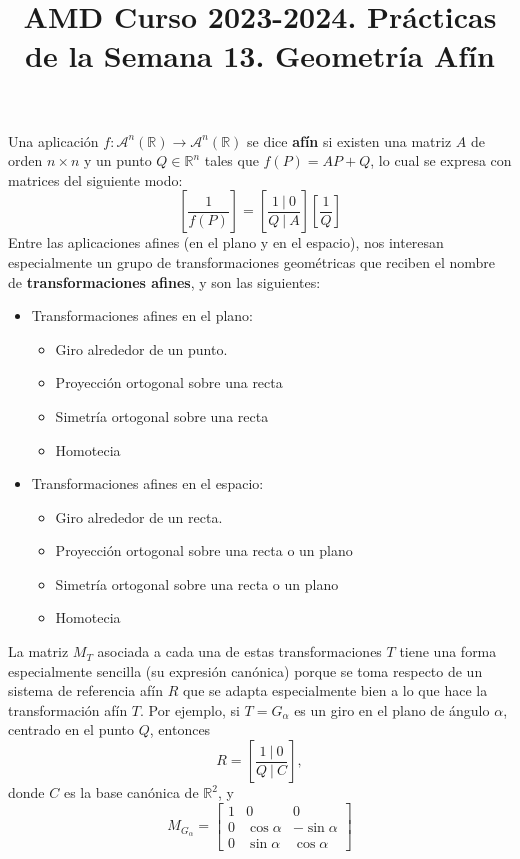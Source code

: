 \documentclass{amsart}
\title{ AMD Curso 2023-2024. Prácticas de la Semana 13. Geometría Afín}
\begin{document}
\maketitle

\begin{tcolorbox}[colback = orange!60!white,title = Cuestiones teóricas previas]
Una aplicación $f:\mathcal{A}^n(\mathbb R) \to \mathcal{A}^n(\mathbb R)$ se dice { \bf afín} si existen una matriz $A$ de orden $n\times n$ y un punto $Q\in \mathbb R^n$ tales que $f(P)=AP+Q$, lo cual se expresa con matrices del siguiente modo: 
$$\left[ \frac{1}{f(P)}\right]=\left[ \frac{ \ 1 
  \ | \  0 \ }{Q \ | \ A}\right] \left[ \frac{1}{Q}\right]$$
Entre las aplicaciones afines (en el plano y en el espacio), nos interesan especialmente un grupo de transformaciones geométricas que reciben el nombre de  {\bf transformaciones afines}, y son las siguientes:
\begin{itemize}
\item Transformaciones afines en el plano:
\begin{itemize}
\item Giro alrededor de un punto.
\item Proyección ortogonal sobre una recta
\item Simetría ortogonal sobre una recta
\item Homotecia
\end{itemize}
\item Transformaciones afines en el espacio:
\begin{itemize}
\item Giro alrededor de un recta.
\item Proyección ortogonal sobre una recta o un plano
\item Simetría ortogonal sobre una recta o un plano
\item Homotecia
\end{itemize}
\end{itemize}
La matriz $M_T$ asociada a cada una de estas transformaciones $T$ tiene una forma especialmente sencilla (su expresión canónica) porque se toma respecto de un sistema de referencia afín $R$ que se adapta especialmente bien a lo que hace la transformación afín $T$. Por ejemplo, si $T=G_{\alpha}$ es un giro en el plano de ángulo $\alpha$, centrado en el punto $Q$, entonces $$R=\left[ \frac{ \ 1 
  \ | \  0 \ }{Q \ | \ C}\right],$$
donde $C$ es la base canónica de $\mathbb{R}^2$, y 
$$M_{G_{\alpha}}= \left[\begin{array}{ccc}  1 & 0 & 0 \\ 0& \cos \alpha & -\sin \alpha \\  0& \sin \alpha & \cos \alpha\end{array}\right]$$


\end{tcolorbox}
\end{document}
